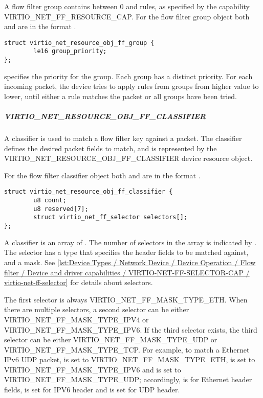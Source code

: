 A flow filter group contains between 0 and  rules, as specified by the
capability VIRTIO_NET_FF_RESOURCE_CAP. For the flow filter group object both
 and
 are in the format
.

\begin{lstlisting}
struct virtio_net_resource_obj_ff_group {
        le16 group_priority;
};
\end{lstlisting}

 specifies the priority for the group. Each group has a
distinct priority. For each incoming packet, the device tries to apply rules
from groups from higher  value to lower, until either a
rule matches the packet or all groups have been tried.

\subparagraph{VIRTIO_NET_RESOURCE_OBJ_FF_CLASSIFIER}\label{par:Device Types / Network Device / Device Operation / Flow filter / Resource objects / VIRTIO-NET-RESOURCE-OBJ-FF-CLASSIFIER}

A classifier is used to match a flow filter key against a packet. The
classifier defines the desired packet fields to match, and is represented by
the VIRTIO_NET_RESOURCE_OBJ_FF_CLASSIFIER device resource object.

For the flow filter classifier object both  and
 are in the format
.

\begin{lstlisting}
struct virtio_net_resource_obj_ff_classifier {
        u8 count;
        u8 reserved[7];
        struct virtio_net_ff_selector selectors[];
};
\end{lstlisting}

A classifier is an array of . The number of selectors in the
array is indicated by . The selector has a type that specifies
the header fields to be matched against, and a mask.
See \ref{lst:Device Types / Network Device / Device Operation / Flow filter / Device and driver capabilities / VIRTIO-NET-FF-SELECTOR-CAP / virtio-net-ff-selector}
for details about selectors.

The first selector is always VIRTIO_NET_FF_MASK_TYPE_ETH. When there are multiple
selectors, a second selector can be either VIRTIO_NET_FF_MASK_TYPE_IPV4
or VIRTIO_NET_FF_MASK_TYPE_IPV6. If the third selector exists, the third
selector can be either VIRTIO_NET_FF_MASK_TYPE_UDP or VIRTIO_NET_FF_MASK_TYPE_TCP.
For example, to match a Ethernet IPv6 UDP packet,
 is set to VIRTIO_NET_FF_MASK_TYPE_ETH, 
is set to VIRTIO_NET_FF_MASK_TYPE_IPV6 and  is
set to VIRTIO_NET_FF_MASK_TYPE_UDP; accordingly,  is
for Ethernet header fields,  is set for IPV6 header
and  is set for UDP header.

